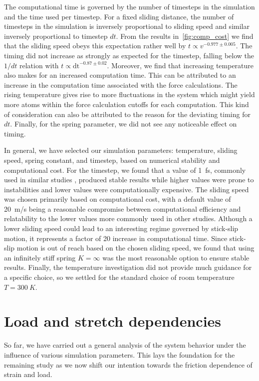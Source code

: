 The computational time is governed by the number of timesteps in the simulation
and the time used per timestep. For a fixed sliding distance, the number of timesteps in the simulation is inversely proportional
to sliding speed and similar inversely proportional to timestep $dt$. From the
results in~\cref{fig:comp_cost} we find that the sliding speed obeys this
expectation rather well by $t \propto v^{-0.977 \pm 0.005}$. The timing did not increase as strongly as expected for the timestep, falling below the $1/dt$ relation with $t
\propto \text{dt}^{-0.87\pm 0.02}$. Moreover, we find that increasing
temperature also makes for an increased computation time. This can be attributed
to an increase in the computation time associated with the force calculations. The
rising temperature gives rise to more fluctuations in the system which might
yield more atoms within the force calculation cutoffs for each computation. This kind of consideration can also be attributed to the reason for the deviating timing for $dt$. Finally, for the spring parameter, we did not see any noticeable effect on timing.


In general, we have selected our simulation parameters: temperature, sliding speed, spring constant, and timestep, based on numerical stability
and computational cost. For the timestep, we found that a value of \SI{1}{fs},
commonly used in similar studies \cite{liu_high-speed_2014, zhu_study_2018},
produced stable results while higher values were prone to instabilities and
lower values were computationally expensive. The sliding speed was chosen primarily based on computational cost, with a default value of \SI{20}{m/s} being a reasonable compromise between computational efficiency and relatability to the lower values more commonly used in other studies. Although a lower sliding speed could lead to an interesting regime governed by stick-slip motion, it represents a factor of 20 increase in computational time. Since stick-slip motion is out of reach based on the chosen sliding speed, we found that using an infinitely stiff spring $K = \infty$ was the most reasonable option to ensure stable results. Finally, the temperature investigation did not provide much guidance for a specific choice, so we settled for the standard choice of room temperature $T = \SI{300}{K}$.



\section{Load and stretch dependencies}\label{sec:load_and_stretch}
So far, we have carried out a general analysis of the system behavior under the influence of various simulation parameters. This lays the foundation for the remaining study as we now shift our intention towards the friction dependence of strain and load.

